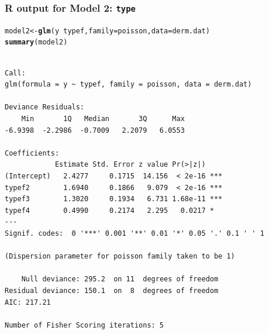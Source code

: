 \documentclass[oneside]{book}\usepackage[]{graphicx}\usepackage[svgnames]{xcolor}
\makeatletter
\newcommand{\hlopt}[1]{\textcolor[rgb]{0,0,0}{#1}}%
\newcommand{\hlstd}[1]{\textcolor[rgb]{0.345,0.345,0.345}{#1}}%
\newcommand{\hlkwb}[1]{\textcolor[rgb]{0.69,0.353,0.396}{#1}}%
\newcommand{\hlkwc}[1]{\textcolor[rgb]{0.333,0.667,0.333}{#1}}%
\newcommand{\hlkwd}[1]{\textcolor[rgb]{0.737,0.353,0.396}{\textbf{#1}}}%
\newenvironment{kframe}{%
 \def\at@end@of@kframe{}%
 \ifinner\ifhmode%
  \def\at@end@of@kframe{\end{minipage}}%
  \begin{minipage}{\columnwidth}%
 \fi\fi%
 \def\FrameCommand##1{\hskip\@totalleftmargin \hskip-\fboxsep
 \colorbox{shadecolor}{##1}\hskip-\fboxsep
     \hskip-\linewidth \hskip-\@totalleftmargin \hskip\columnwidth}%
 \MakeFramed {\advance\hsize-\width
   \@totalleftmargin\z@ \linewidth\hsize
   \@setminipage}}%
 {\par\unskip\endMakeFramed%
 \at@end@of@kframe}
\newenvironment{knitrout}{}{} %
\makeatother
\begin{document}
\subsubsection*{R output for Model 2: \texttt{type}}
\begin{knitrout}
\color{fgcolor}\begin{kframe}
\begin{alltt}
\hlstd{model2} \hlkwb{<-} \hlkwd{glm}\hlstd{(y} \hlopt{~} \hlstd{typef,} \hlkwc{family} \hlstd{= poisson,} \hlkwc{data} \hlstd{= derm.dat)}
\hlkwd{summary}\hlstd{(model2)}
\end{alltt}
\begin{verbatim}

Call:
glm(formula = y ~ typef, family = poisson, data = derm.dat)

Deviance Residuals: 
    Min       1Q   Median       3Q      Max  
-6.9398  -2.2986  -0.7009   2.2079   6.0553  

Coefficients:
            Estimate Std. Error z value Pr(>|z|)    
(Intercept)   2.4277     0.1715  14.156  < 2e-16 ***
typef2        1.6940     0.1866   9.079  < 2e-16 ***
typef3        1.3020     0.1934   6.731 1.68e-11 ***
typef4        0.4990     0.2174   2.295   0.0217 *  
---
Signif. codes:  0 '***' 0.001 '**' 0.01 '*' 0.05 '.' 0.1 ' ' 1

(Dispersion parameter for poisson family taken to be 1)

    Null deviance: 295.2  on 11  degrees of freedom
Residual deviance: 150.1  on  8  degrees of freedom
AIC: 217.21

Number of Fisher Scoring iterations: 5
\end{verbatim}
\end{kframe}
\end{knitrout}
\end{document}
